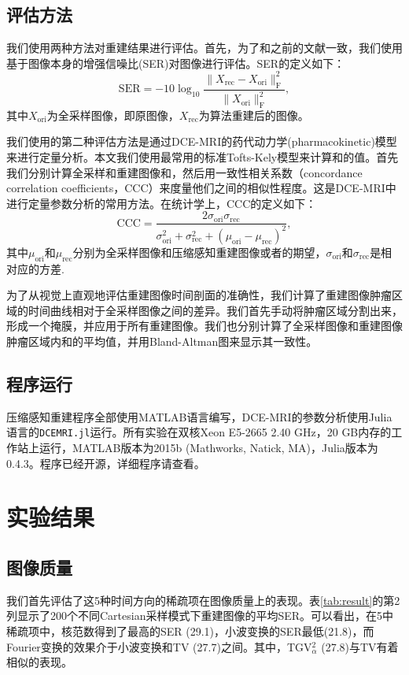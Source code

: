 \subsection{评估方法}
我们使用两种方法对重建结果进行评估。首先，为了和之前的文献一致，我们使用基于图像本身的增强信噪比(SER)对图像进行评估。SER的定义如下：
\begin{equation}
\mathrm{SER} = -10 \log_{10}\frac{\|X_\mathrm{rec}-X_\mathrm{ori}\|_\mathrm{F}^2}{\|X_\mathrm{ori}\|_\mathrm{F}^2},
\end{equation}
其中$X_{\mathrm{ori}}$为全采样图像，即原图像，$X_{\mathrm{rec}}$为算法重建后的图像。

我们使用的第二种评估方法是通过DCE-MRI的药代动力学(pharmacokinetic)模型来进行定量分析。本文我们使用最常用的标准Tofts-Kely模型\cite{tofts}来计算\kt 和\Ve 的值。首先我们分别计算全采样和重建图像\kt 和\Ve，然后用一致性相关系数（concordance correlation coefficients，CCC）来度量他们之间的相似性程度。这是DCE-MRI中进行定量参数分析的常用方法。在统计学上，CCC的定义如下：
\begin{equation}
\mathrm{CCC} = \frac{2\sigma_\mathrm{ori} \sigma_\mathrm{rec}}{\sigma_\mathrm{ori}^2+\sigma_\mathrm{rec}^2+(\mu_\mathrm{ori}-\mu_\mathrm{rec})^2},
\end{equation}
其中$\mu_\mathrm{ori}$和$\mu_\mathrm{rec}$分别为全采样图像和压缩感知重建图像\kt 或者\Ve 的期望，$\sigma_\mathrm{ori}$和$\sigma_\mathrm{rec}$是相对应的方差.

为了从视觉上直观地评估重建图像时间剖面的准确性，我们计算了重建图像肿瘤区域的时间曲线相对于全采样图像之间的差异。我们首先手动将肿瘤区域分割出来，形成一个掩膜，并应用于所有重建图像。我们也分别计算了全采样图像和重建图像肿瘤区域内\kt 和\Ve 的平均值，并用Bland-Altman图来显示其一致性。

\subsection{程序运行}
压缩感知重建程序全部使用MATLAB语言编写，DCE-MRI的参数分析使用Julia语言的\texttt{DCEMRI.jl}\cite{Smith2015}运行。所有实验在双核Xeon E5-2665 2.40 GHz，20 GB内存的工作站上运行，MATLAB版本为2015b (Mathworks, Natick, MA)，Julia版本为0.4.3。程序已经开源，详细程序请查看\cite{qetsr}。

\section{实验结果}
\subsection{图像质量}
我们首先评估了这5种时间方向的稀疏项在图像质量上的表现。表\ref{tab:result}的第2列显示了200个不同Cartesian采样模式下重建图像的平均SER。可以看出，在5中稀疏项中，核范数得到了最高的SER (29.1)，小波变换的SER最低(21.8)，而Fourier变换的效果介于小波变换和TV (27.7)之间。其中，TGV$_\alpha^2$ (27.8)与TV有着相似的表现。

